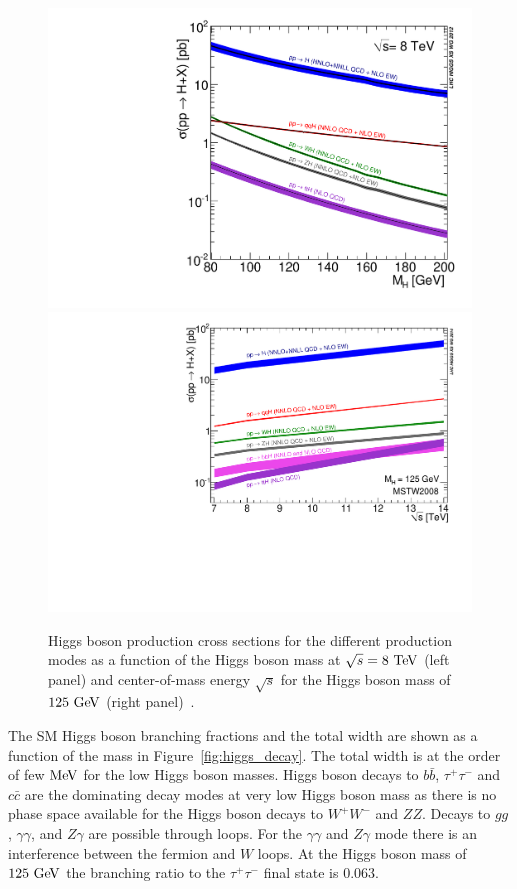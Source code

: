 \begin{figure}[ht]
\centering
\includegraphics[width=0.49\columnwidth]{figures_chapter2/Higgs_XS_8TeV_LM200}
\includegraphics[width=0.49\columnwidth]{figures_chapter2/7-14}
\caption{Higgs boson production cross sections for the different production modes as a function of the Higgs boson mass at $\sqrt{s}=8~\mathrm{Te\kern -0.1em V}$ (left panel) and center-of-mass energy $\sqrt{s}$ for the Higgs boson mass of $125~\mathrm{Ge\kern -0.1em V}$ (right panel)~\cite{Dittmaier:2011ti,Dittmaier:2012vm,Heinemeyer:2013tqa}.}
\label{fig:higgs_cross}
\end{figure} 

The SM Higgs boson branching fractions and the total width are shown as a function of the mass in Figure~\ref{fig:higgs_decay}. The total width is at the order of few $\mathrm{Me\kern -0.1em V}$ for the low Higgs boson masses. Higgs boson decays to $b\bar{b}$, $\tau^{+}\tau^{-}$ and $c\bar{c}$ are the dominating decay modes at very low Higgs boson mass as there is no phase space available for the Higgs boson decays to $W^{+}W^{-}$ and $ZZ$. Decays to $gg$, $\gamma\gamma$, and $Z\gamma$ are possible through loops. For the $\gamma\gamma$ and $Z\gamma$ mode there is an interference between the fermion and $W$ loops.  At the Higgs boson mass of $125~\mathrm{Ge\kern -0.1em V}$ the branching ratio to the $\tau^{+}\tau^{-}$ final state is $0.063$.

